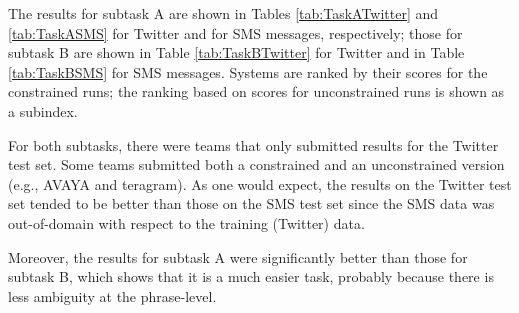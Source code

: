 
The results for subtask A are shown in Tables \ref{tab:TaskATwitter} and \ref{tab:TaskASMS} for Twitter and for SMS messages, respectively;
those for subtask B are shown in Table \ref{tab:TaskBTwitter} for Twitter and in Table \ref{tab:TaskBSMS} for SMS messages.
Systems are ranked by their scores for the constrained runs;
the ranking based on scores for unconstrained runs is shown as a subindex.


For both subtasks, there were teams that only submitted results for the Twitter test set.
Some teams submitted both a constrained and an unconstrained version (e.g., AVAYA and teragram).
As one would expect,
the results on the Twitter test set tended to be better than those on the SMS test set
since the SMS data was out-of-domain with respect to the training (Twitter) data.

Moreover, the results for subtask A were significantly better than those for subtask B, which shows that it is a much easier task,
probably because there is less ambiguity at the phrase-level.



